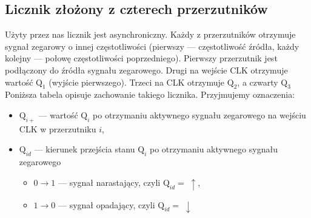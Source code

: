 \documentclass{article}
\begin{document}
    \subsection{Licznik złożony z czterech przerzutników}
    Użyty przez nas licznik jest asynchroniczny. Każdy z przerzutników otrzymuje sygnał zegarowy o innej częstotliwości
    (pierwszy --- częstotliwość źródła, każdy kolejny --- połowę częstotliwości poprzedniego).
    Pierwszy przerzutnik jest podłączony do źródła sygnału zegarowego. Drugi na wejście CLK otrzymuje
    wartość \(\mbox{Q}_1\) (wyjście pierwszego). Trzeci na CLK otrzymuje \(\mbox{Q}_2\), a czwarty \(\mbox{Q}_3\)Poniższa tabela opisuje zachowanie takiego licznika. Przyjmujemy oznaczenia:
    \begin{itemize}
        \item \(\mbox{Q}_{i+}\) --- wartość \(\mbox{Q}_i\) po otrzymaniu aktywnego sygnału zegarowego na wejściu CLK w przerzutniku \(i\),
        \item \(\mbox{Q}_{id}\) --- kierunek przejścia stanu \(\mbox{Q}_i\) po otrzymaniu aktywnego sygnału zegarowego \begin{itemize}
            \item \(0\rightarrow 1\) --- sygnał narastający, czyli \(\mbox{Q}_{id}=\;\uparrow\),
            \item \(1\rightarrow 0\) --- sygnał opadający, czyli \(\mbox{Q}_{id}=\;\downarrow\)
        \end{itemize}
    \end{itemize}
\end{document}
